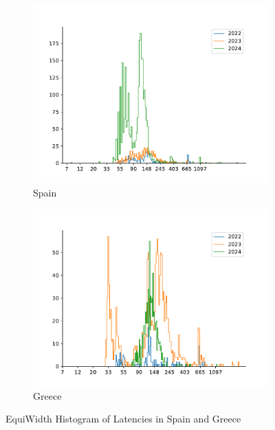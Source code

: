 \begin{figure}
	\centering
	\begin{subfigure}[b]{0.8\linewidth}
		\includegraphics[width=\linewidth]{chapters/4-results/latency/img/histogram_of_latencies_of_starlink_probes_in_spain.pdf}
		\caption{Spain}
	\end{subfigure}
	\begin{subfigure}[b]{0.8\linewidth}
		\includegraphics[width=\linewidth]{chapters/4-results/latency/img/histogram_of_latencies_of_starlink_probes_in_greece.pdf}
		\caption{Greece}
	\end{subfigure}
	\caption{EquiWidth Histogram of Latencies in Spain and Greece}
	\label{fig:latency-histogram-4}
\end{figure}

